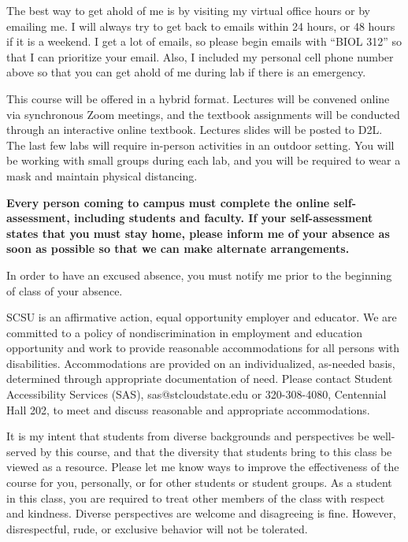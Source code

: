 \documentclass{tufte-handout}
\begin{document}
\begin{fullwidth}
\newpage


 The best way to get ahold of me is by visiting my virtual office hours or by emailing me. I will always try to get back to emails within 24 hours, or 48 hours if it is a weekend. I get a lot of emails, so please begin emails with ``BIOL 312'' so that I can prioritize your email. Also, I included my personal cell phone number above so that you can get ahold of me during lab if there is an emergency.

 This course will be offered in a hybrid format. Lectures will be convened online via synchronous Zoom meetings, and the textbook assignments will be conducted through an interactive online textbook. Lectures slides will be posted to D2L. The last few labs will require in-person activities in an outdoor setting. You will be working with small groups during each lab, and you will be required to wear a mask and maintain physical distancing. 

\textbf{Every person coming to campus must complete the online self-assessment, including students and faculty. If your self-assessment states that you must stay home, please inform me of your absence as soon as possible so that we can make alternate arrangements.}

\color{blue}
In order to have an excused absence, you must notify me prior to the beginning of class of your absence.
\color{black}



 SCSU is an affirmative action, equal opportunity employer and educator. We are committed to a policy of nondiscrimination in employment and education opportunity and work to provide reasonable accommodations for all persons with disabilities. Accommodations are provided on an individualized, as-needed basis, determined through appropriate documentation of need. Please contact Student Accessibility Services (SAS), sas@stcloudstate.edu or 320-308-4080, Centennial Hall 202, to meet and discuss reasonable and appropriate accommodations. 

 It is my intent that students from diverse backgrounds and perspectives be well-served by this course, and that the diversity that students bring to this class be viewed as a resource. Please let me know ways to improve the effectiveness of the course for you, personally, or for other students or student groups. As a student in this class, you are required to treat other members of the class with respect and kindness. Diverse perspectives are welcome and disagreeing is fine. However, disrespectful, rude, or exclusive behavior will not be tolerated.



\end{fullwidth}
\end{document}
